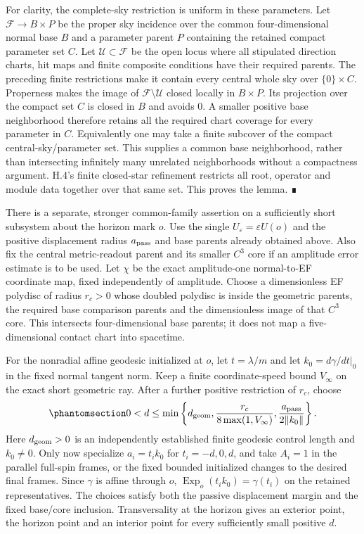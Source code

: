 \documentclass[
  english,
  11pt,
  reqno]{amsart}
\begin{document}
For clarity, the complete-sky restriction is uniform in these
parameters. Let \(\mathcal F\to B\times P\) be the proper sky incidence
over the common four-dimensional normal base \(B\) and a parameter
parent \(P\) containing the retained compact parameter set \(C\). Let
\(\mathcal U\subset\mathcal F\) be the open locus where all stipulated
direction charts, hit maps and finite composite conditions have their
required parents. The preceding finite restrictions make it contain
every central whole sky over \(\{0\}\times C\). Properness makes the
image of \(\mathcal F\setminus\mathcal U\) closed locally in
\(B\times P\). Its projection over the compact set \(C\) is closed in
\(B\) and avoids \(0\). A smaller positive base neighborhood therefore
retains all the required chart coverage for every parameter in \(C\).
Equivalently one may take a finite subcover of the compact
central-sky/parameter set. This supplies a common base neighborhood,
rather than intersecting infinitely many unrelated neighborhoods without
a compactness argument. H.4's finite closed-star refinement restricts
all root, operator and module data together over that same set. This
proves the lemma. ∎

There is a separate, stronger common-family assertion on a sufficiently
short subsystem about the horizon mark \(o\). Use the single
\(U_\varepsilon=\varepsilon U(o)\) and the positive displacement radius
\(a_{\rm pass}\) and base parents already obtained above. Also fix the
central metric-readout parent and its smaller \(C^3\) core if an
amplitude error estimate is to be used. Let \(\chi\) be the exact
amplitude-one normal-to-EF coordinate map, fixed independently of
amplitude. Choose a dimensionless EF polydisc of radius \(r_c>0\) whose
doubled polydisc is inside the geometric parents, the required base
comparison parents and the dimensionless image of that \(C^3\) core.
This intersects four-dimensional base parents; it does not map a
five-dimensional contact chart into spacetime.

For the nonradial affine geodesic initialized at \(o\), let
\(t=\lambda/m\) and let \(k_0=d\gamma/dt|_0\) in the fixed normal
tangent norm. Keep a finite coordinate-speed bound \(V_\infty\) on the
exact short geometric ray. After a further positive restriction of
\(r_c\), choose
\begin{equation}\protect\phantomsection\label{eq:schw-bc-common-subsystem-length}{
 0<d\le\min\left\{
 d_{\rm geom},\frac{r_c}{8\max(1,V_\infty)},
 \frac{a_{\rm pass}}{2\|k_0\|}
 \right\}.
}\end{equation} Here \(d_{\rm geom}>0\) is an independently established
finite geodesic control length and \(k_0\ne0\). Only now specialize
\(a_i=t_i k_0\) for \(t_i=-d,0,d\), and take \(A_i=1\) in the parallel
full-spin frames, or the fixed bounded initialized changes to the
desired final frames. Since \(\gamma\) is affine through \(o\),
\(\operatorname{Exp}_o(t_i k_0)=\gamma(t_i)\) on the retained
representatives. The choices satisfy both the passive displacement
margin and the fixed base/core inclusion. Transversality at the horizon
gives an exterior point, the horizon point and an interior point for
every sufficiently small positive \(d\).
\end{document}
